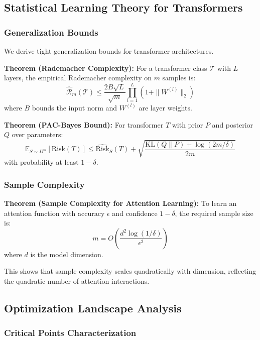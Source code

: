 \documentclass[11pt]{article}
\begin{document}
\subsection{Statistical Learning Theory for Transformers}

\subsubsection{Generalization Bounds}

We derive tight generalization bounds for transformer architectures.

\textbf{Theorem (Rademacher Complexity):} For a transformer class $\mathcal{T}$ with $L$ layers, the empirical Rademacher complexity on $m$ samples is:
\begin{equation}
\hat{\mathcal{R}}_m(\mathcal{T}) \leq \frac{2B\sqrt{L}}{\sqrt{m}} \prod_{l=1}^{L} (1 + \|W^{(l)}\|_2)
\end{equation}
where $B$ bounds the input norm and $W^{(l)}$ are layer weights.

\textbf{Theorem (PAC-Bayes Bound):} For transformer $T$ with prior $P$ and posterior $Q$ over parameters:
\begin{equation}
\mathbb{E}_{S \sim D^m}[\text{Risk}(T)] \leq \hat{\text{Risk}}_S(T) + \sqrt{\frac{\text{KL}(Q\|P) + \log(2m/\delta)}{2m}}
\end{equation}
with probability at least $1-\delta$.

\subsubsection{Sample Complexity}

\textbf{Theorem (Sample Complexity for Attention Learning):} To learn an attention function with accuracy $\epsilon$ and confidence $1-\delta$, the required sample size is:
\begin{equation}
m = O\left(\frac{d^2 \log(1/\delta)}{\epsilon^2}\right)
\end{equation}
where $d$ is the model dimension.

This shows that sample complexity scales quadratically with dimension, reflecting the quadratic number of attention interactions.

\subsection{Optimization Landscape Analysis}

\subsubsection{Critical Points Characterization}
\end{document}
